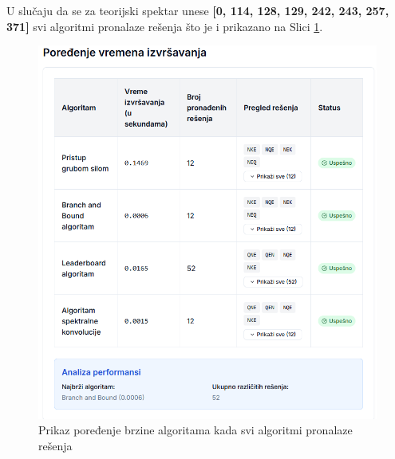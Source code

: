 \documentclass[12pt,oneside]{memoir}
\begin{document}
U slučaju da se za teorijski spektar unese \textbf{[0, 114, 128, 129, 242, 243, 257, 371]} svi algoritmi pronalaze rešenja što je i prikazano na Slici \ref{fig:comparison_all_solution}.
\begin{figure}[H]
\centering
\includegraphics[width=1\textwidth]{images/comparison_all_solution.png}
\caption{Prikaz poređenje brzine algoritama kada svi algoritmi pronalaze rešenja}
\label{fig:comparison_all_solution}
\end{figure}
\end{document}
